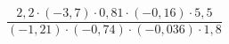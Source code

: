 \begin{ex}[type=calculate]
	\begin{condition}
		\( \dfrac{2,2\cdot(-3,7)\cdot0,81\cdot(-0,16)\cdot5,5}{(-1,21)\cdot(-0,74)\cdot(-0,036)\cdot1,8} \)
	\end{condition}
	\answer{}
\end{ex}